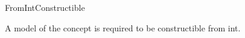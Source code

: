 \begin{ccRefConcept}{FromIntConstructible}

\ccDefinition
  
A model of the concept  is required 
to be constructible from int. 

\ccCreation
{}  %


\ccHasModels
{}\\
\\
\\
\end{ccRefConcept}